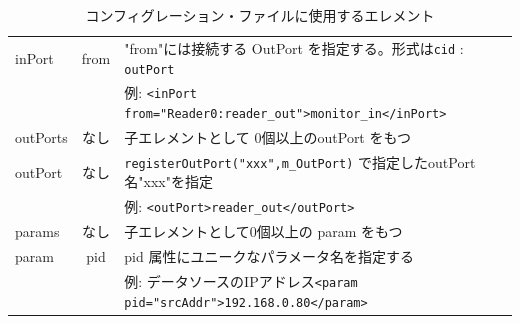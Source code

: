 \documentclass[a4j,10pt,dvips,onecolumn,oneside,final]{jarticle}%
\begin{document}
\begin{table}[htbp]
\begin{center}
{\begin{tabular}{|l|c|l|}
      inPort      &  from & "from"には接続する OutPort を指定する。形式は\verb|cid| : \verb|outPort|\\
                  &       & 例: \verb|<inPort from="Reader0:reader_out">monitor_in</inPort>|\\ \hline
      outPorts    &  なし & 子エレメントとして 0個以上のoutPort をもつ\\ \hline
      outPort     &  なし & \verb|registerOutPort("xxx",m_OutPort)| で指定したoutPort名"xxx"を指定\\
                  &       & 例: \verb|<outPort>reader_out</outPort>|\\ \hline
      params      &  なし & 子エレメントとして0個以上の param をもつ\\ \hline
      param       &  pid  & pid 属性にユニークなパラメータ名を指定する\\
                  &       & 例: データソースのIPアドレス\verb|<param pid="srcAddr">192.168.0.80</param>|\\ \hline
    \end{tabular}
    \caption{コンフィグレーション・ファイルに使用するエレメント}
    \label{tag.tab}
}
\end{center}
\end{table}
\end{document}
